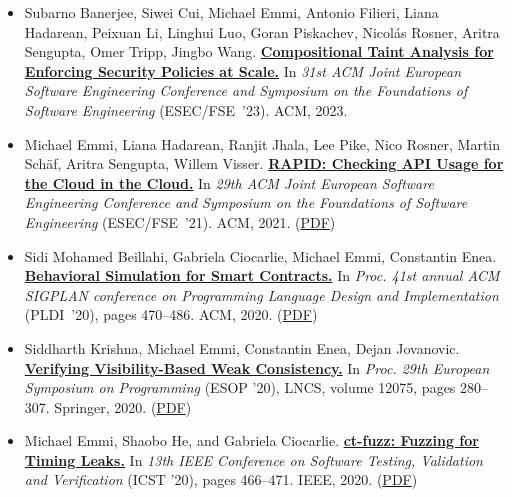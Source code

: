 \documentclass{article}
\begin{document}
  \begin{itemize}[leftmargin=0cm,label={}]

    \item Subarno Banerjee, Siwei Cui, Michael Emmi, Antonio Filieri, Liana Hadarean, Peixuan Li, Linghui Luo, Goran Piskachev, Nicolás Rosner, Aritra Sengupta, Omer Tripp, Jingbo Wang. {\bf\href{%
    https://doi.org/10.1145/3611643.3613889}{%
    Compositional Taint Analysis for Enforcing Security Policies at Scale.}} In \emph{ 31st ACM Joint European Software Engineering Conference and Symposium on the Foundations of Software Engineering } (ESEC/FSE ’23). ACM, 2023. 


    \item Michael Emmi, Liana Hadarean, Ranjit Jhala, Lee Pike, Nico Rosner, Martin Schäf, Aritra Sengupta, Willem Visser. {\bf\href{%
    https://doi.org/10.1145/3468264.3473934}{%
    RAPID: Checking API Usage for the Cloud in the Cloud.}} In \emph{ 29th ACM Joint European Software Engineering Conference and Symposium on the Foundations of Software Engineering } (ESEC/FSE ’21). ACM, 2021. (\href{https://michael-emmi.github.io/https://github.com/michael-emmi/research-papers/raw/master/conf-sigsoft-EmmiHJPRSSV21.pdf}{PDF})


    \item Sidi Mohamed Beillahi, Gabriela Ciocarlie, Michael Emmi, Constantin Enea. {\bf\href{%
    https://doi.org/10.1145/3385412.3386022}{%
    Behavioral Simulation for Smart Contracts.}} In \emph{ Proc. 41st annual ACM SIGPLAN conference on Programming Language Design and Implementation } (PLDI ’20), pages 470–486. ACM, 2020. (\href{https://michael-emmi.github.io/https://github.com/michael-emmi/research-papers/raw/master/conf-pldi-BeillahiCEE20.pdf}{PDF})


    \item Siddharth Krishna, Michael Emmi, Constantin Enea, Dejan Jovanovic. {\bf\href{%
    https://doi.org/10.1007/978-3-030-44914-8_11}{%
    Verifying Visibility-Based Weak Consistency.}} In \emph{ Proc. 29th European Symposium on Programming } (ESOP ’20), LNCS, volume 12075, pages 280–307. Springer, 2020. (\href{https://michael-emmi.github.io/https://github.com/michael-emmi/research-papers/raw/master/conf-esop-KrishnaEEJ20.pdf}{PDF})


    \item Michael Emmi, Shaobo He, and Gabriela Ciocarlie. {\bf\href{%
    https://doi.org/10.1109/ICST46399.2020.00063}{%
    ct-fuzz: Fuzzing for Timing Leaks.}} In \emph{ 13th IEEE Conference on Software Testing, Validation and Verification } (ICST ’20), pages 466–471. IEEE, 2020. (\href{https://michael-emmi.github.io/https://github.com/michael-emmi/research-papers/raw/master/conf-icst-HeEC20.pdf}{PDF})



\end{itemize}
\end{document}
